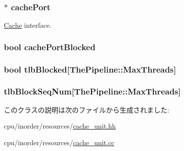 \label{classCacheUnit_a9d95d13b55fcaa47810d188d54903caf}
\hypertarget{classCacheUnit_a6acbf550d7553b77d4e6f42d91133da6}{
\subsubsection[{cachePort}]{$\ast$ {\bf cachePort}}}
\label{classCacheUnit_a6acbf550d7553b77d4e6f42d91133da6}
\hyperlink{classCache}{Cache} interface. \hypertarget{classCacheUnit_abe897aa45cc14999423020f95746328a}{
\subsubsection[{cachePortBlocked}]{\setlength{\rightskip}{0pt plus 5cm}bool {\bf cachePortBlocked}}}
\label{classCacheUnit_abe897aa45cc14999423020f95746328a}
\hypertarget{classCacheUnit_a1e5ca2b940e91b19e93867cc549fe65d}{
\subsubsection[{tlbBlocked}]{\setlength{\rightskip}{0pt plus 5cm}bool {\bf tlbBlocked}\mbox{[}{\bf ThePipeline::MaxThreads}\mbox{]}}}
\label{classCacheUnit_a1e5ca2b940e91b19e93867cc549fe65d}
\hypertarget{classCacheUnit_a26ded431132c6ee52a8b8bdc8ddd837c}{
\subsubsection[{tlbBlockSeqNum}]{ {\bf tlbBlockSeqNum}\mbox{[}{\bf ThePipeline::MaxThreads}\mbox{]}}}
\label{classCacheUnit_a26ded431132c6ee52a8b8bdc8ddd837c}


このクラスの説明は次のファイルから生成されました:\begin{DoxyCompactItemize}
\item 
cpu/inorder/resources/\hyperlink{cache__unit_8hh}{cache\_\-unit.hh}\item 
cpu/inorder/resources/\hyperlink{cache__unit_8cc}{cache\_\-unit.cc}\end{DoxyCompactItemize}
